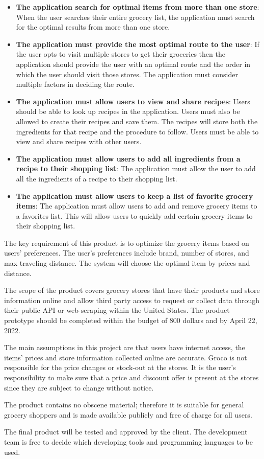 \begin{itemize}
\item \textbf{The application search for optimal items from more than one store}: When the user searches their entire grocery list, the application must search for the optimal results from more than one store.

\item \textbf{The application must provide the most optimal route to the user}: If the user opts to visit multiple stores to get their groceries then the application should provide the user with an optimal route and the order in which the user should visit those stores. The application must consider multiple factors in deciding the route.

\item \textbf{The application must allow users to view and share recipes}: Users should be able to look up recipes in the application. Users must also be allowed to create their recipes and save them. The recipes will store both the ingredients for that recipe and the procedure to follow. Users must be able to view and share recipes with other users.

\item \textbf{The application must allow users to add all ingredients from a recipe to their shopping list}: The application must allow the user to add all the ingredients of a recipe to their shopping list.

\item \textbf{The application must allow users to keep a list of favorite grocery items}: The application must allow users to add and remove grocery items to a favorites list. This will allow users to quickly add certain grocery items to their shopping list.

\end{itemize} 

The key requirement of this product is to optimize the grocery items based on users' preferences. The user's preferences include brand, number of stores, and max traveling distance. The system will choose the optimal item by prices and distance.  

The scope of the product covers grocery stores that have their products and store information online and allow third party access to request or collect data through their public API or web-scraping within the United States. The product prototype should be completed within the budget of 800 dollars and by April 22, 2022.

The main assumptions in this project are that users have internet access, the items' prices and store information collected online are accurate. Groco is not responsible for the price changes or stock-out at the stores. It is the user's responsibility to make sure that a price and discount offer is present at the stores since they are subject to change without notice.

The product contains no obscene material; therefore it is suitable for general grocery shoppers and is made available publicly and free of charge for all users.

The final product will be tested and approved by the client. The development team is free to decide which developing tools and programming languages to be used.

